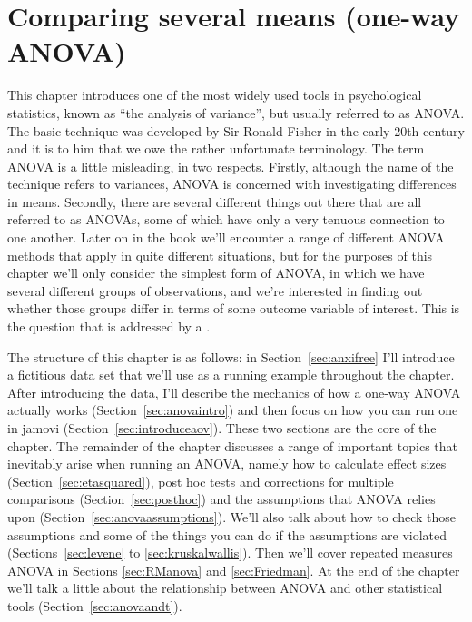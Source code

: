 

\chapter{Comparing several means (one-way ANOVA)\label{ch:anova}}

This chapter introduces one of the most widely used tools in psychological statistics, known as ``the analysis of variance'', but usually referred to as ANOVA. The basic technique was developed by Sir Ronald Fisher in the early 20th century and it is to him that we owe the rather unfortunate terminology. The term ANOVA is a little misleading, in two respects. Firstly, although the name of the technique refers to variances, ANOVA is concerned with investigating differences in means. Secondly, there are several different things out there that are all referred to as ANOVAs, some of which have only a very tenuous connection to one another. Later on in the book we'll encounter a range of different ANOVA methods that apply in quite different situations, but for the purposes of this chapter we'll only consider the simplest form of ANOVA, in which we have several different groups of observations, and we're interested in finding out whether those groups differ in terms of some outcome variable of interest. This is the question that is addressed by a . 

The structure of this chapter is as follows: in Section~\ref{sec:anxifree} I'll introduce a fictitious data set that we'll use as a running example throughout the chapter. After introducing the data, I'll describe the mechanics of how a one-way ANOVA actually works (Section~\ref{sec:anovaintro}) and then focus on how you can run one in jamovi (Section~\ref{sec:introduceaov}). These two sections are the core of the chapter. The remainder of the chapter discusses a range of important topics that inevitably arise when running an ANOVA, namely how to calculate effect sizes (Section~\ref{sec:etasquared}), post hoc tests and corrections for multiple comparisons (Section~\ref{sec:posthoc}) and the assumptions that ANOVA relies upon (Section~\ref{sec:anovaassumptions}). We'll also talk about how to check those assumptions and some of the things you can do if the assumptions are violated (Sections~\ref{sec:levene} to \ref{sec:kruskalwallis}). Then we'll cover repeated measures ANOVA in Sections \ref{sec:RManova} and \ref{sec:Friedman}. At the end of the chapter we'll talk a little about the relationship between ANOVA and other statistical tools (Section~\ref{sec:anovaandt}). 


